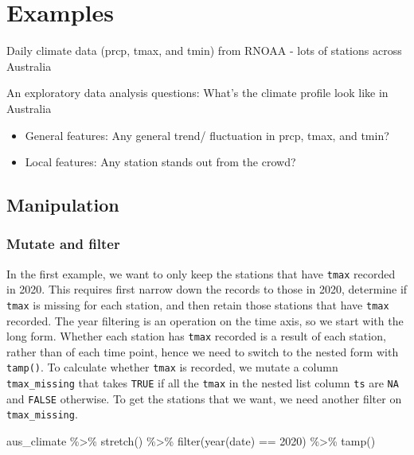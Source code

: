 \documentclass{article}
\newenvironment{Shaded}{\begin{snugshade}}{\end{snugshade}}
\newcommand{\DecValTok}[1]{\textcolor[rgb]{0.00,0.00,0.81}{#1}}
\newcommand{\FunctionTok}[1]{\textcolor[rgb]{0.00,0.00,0.00}{#1}}
\newcommand{\NormalTok}[1]{#1}
\newcommand{\SpecialCharTok}[1]{\textcolor[rgb]{0.00,0.00,0.00}{#1}}
\begin{document}
\newpage

\hypertarget{examples}{%
\section{Examples}\label{examples}}

Daily climate data (prcp, tmax, and tmin) from RNOAA - lots of stations
across Australia

An exploratory data analysis questions: What's the climate profile look
like in Australia

\begin{itemize}
\tightlist
\item
  General features: Any general trend/ fluctuation in prcp, tmax, and
  tmin?
\item
  Local features: Any station stands out from the crowd?
\end{itemize}

\hypertarget{manipulation}{%
\subsection{Manipulation}\label{manipulation}}

\hypertarget{mutate-and-filter}{%
\subsubsection{Mutate and filter}\label{mutate-and-filter}}

In the first example, we want to only keep the stations that have
\texttt{tmax} recorded in 2020. This requires first narrow down the
records to those in 2020, determine if \texttt{tmax} is missing for each
station, and then retain those stations that have \texttt{tmax}
recorded. The year filtering is an operation on the time axis, so we
start with the long form. Whether each station has \texttt{tmax}
recorded is a result of each station, rather than of each time point,
hence we need to switch to the nested form with \texttt{tamp()}. To
calculate whether \texttt{tmax} is recorded, we mutate a column
\texttt{tmax\_missing} that takes \texttt{TRUE} if all the \texttt{tmax}
in the nested list column \texttt{ts} are \texttt{NA} and \texttt{FALSE}
otherwise. To get the stations that we want, we need another filter on
\texttt{tmax\_missing}.

\begin{Shaded}
\begin{Highlighting}[]
\NormalTok{aus\_climate }\SpecialCharTok{\%\textgreater{}\%} 
  \FunctionTok{stretch}\NormalTok{() }\SpecialCharTok{\%\textgreater{}\%} 
  \FunctionTok{filter}\NormalTok{(}\FunctionTok{year}\NormalTok{(date) }\SpecialCharTok{==} \DecValTok{2020}\NormalTok{) }\SpecialCharTok{\%\textgreater{}\%} 
  \FunctionTok{tamp}\NormalTok{()}
\end{Highlighting}
\end{Shaded}
\end{document}
